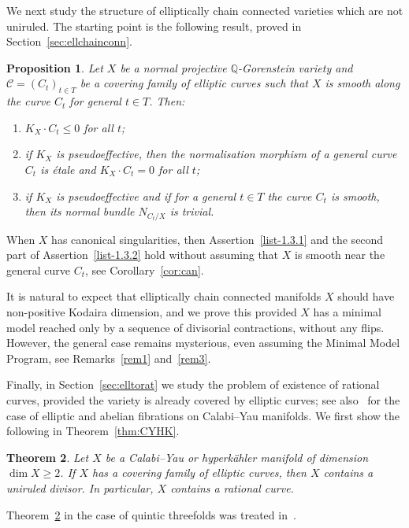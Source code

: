 \documentclass[11pt]{article}
\newtheorem{theo}{Theorem}[section]
\newtheorem{prop}[theo]{Proposition}
\theoremstyle{definition}
\numberwithin{equation}{section}
\numberwithin{figure}{section}
\numberwithin{table}{section}
\newcommand{\Qbb}{\mathbb{Q}} %
\newcommand\sC{\mathcal{C}}
\newcommand*{\romanenumi}{\renewcommand*{\theenumi}{\roman{enumi}}}
\begin{document}
We next study the structure of elliptically chain connected varieties which are not uniruled. The starting point is the following result, proved in Section~\ref{sec:ellchainconn}.

\begin{prop}\label{prop:1.3}
Let $X$ be a normal projective $\Qbb$-Gorenstein variety and $\sC = (C_t)_{t\in T} $ be a covering family of elliptic curves such that $X$ is smooth along the curve $C_t$ for general $t\in T$. Then:
\begin{enumerate}\romanenumi
\item \label{list-1.3.1}$K_X \cdot C_t \leq 0$ for all $t$;
\item \label{list-1.3.2}if $K_X$ is pseudoeffective, then the normalisation morphism of a general curve $C_t$ is étale and $K_X \cdot C_t = 0$ for all $t$;
\item \label{list-1.3.3}if $K_X$ is pseudoeffective and if for a general $t\in T$ the curve $C_t$ is smooth, then its normal bundle $N_{C_t/X}$ is trivial.
\end{enumerate}
\end{prop}

When $X$ has canonical singularities, then Assertion~\eqref{list-1.3.1} and the second part of Assertion~\eqref{list-1.3.2} hold without assuming that $X$ is smooth near the general curve $C_t$, see Corollary~\ref{cor:can}.

It is natural to expect that elliptically chain connected manifolds $X$ should have non-positive Kodaira dimension, and we prove this provided $X$ has a minimal model reached only by a sequence of divisorial contractions, without any flips. However, the general case remains mysterious, even assuming the Minimal Model Program, see Remarks~\ref{rem1} and~\ref{rem3}.


Finally, in Section~\ref{sec:elltorat} we study the problem of existence of rational curves, provided the variety is already covered by elliptic curves; see also~\cite{DFM16} for the case of elliptic and abelian fibrations on Calabi--Yau manifolds. We first show the following in Theorem~\ref{thm:CYHK}.

\begin{theo}\label{thm:D}
Let $X$ be a Calabi--Yau or hyperkähler manifold of dimension $\dim X \geq 2$. If $X$ has a covering family of elliptic curves, then $X$ contains a uniruled divisor. In particular, $X$ contains a rational curve.
\end{theo}

Theorem~\ref{thm:D} in the case of quintic threefolds was treated in~\cite[Lecture 22]{CKL88}.
\end{document}
